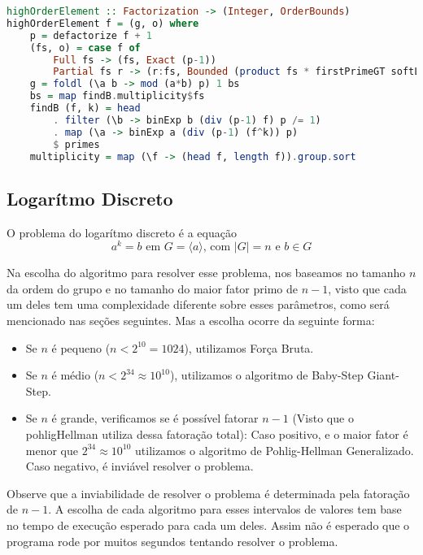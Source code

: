 \documentclass{article}
\begin{document}
\noindent\hspace{0.03\linewidth}
\begin{minipage}{.9\linewidth}
\begin{lstlisting}[language=haskell,caption=Algoritmo de Gauss]
highOrderElement :: Factorization -> (Integer, OrderBounds)
highOrderElement f = (g, o) where
    p = defactorize f + 1
    (fs, o) = case f of
        Full fs -> (fs, Exact (p-1))
        Partial fs r -> (r:fs, Bounded (product fs * firstPrimeGT softLimit) (p-1))
    g = foldl (\a b -> mod (a*b) p) 1 bs
    bs = map findB.multiplicity$fs
    findB (f, k) = head
        . filter (\b -> binExp b (div (p-1) f) p /= 1)
        . map (\a -> binExp a (div (p-1) (f^k)) p)
        $ primes
    multiplicity = map (\f -> (head f, length f)).group.sort

\end{lstlisting}
\end{minipage}

\subsection{Logarítmo Discreto}
\label{discreteLog}
O problema do logarítmo discreto é a equação
$$ a^k = b \text{ em } G = \langle a \rangle\text{, com }|G| = n\text{ e }b \in G$$

Na escolha do algoritmo para resolver esse problema, nos baseamos no tamanho $n$ da ordem do grupo e no tamanho do maior fator primo de $n-1$, visto que cada um deles tem uma complexidade diferente sobre esses parâmetros, como será mencionado nas seções seguintes. Mas a escolha ocorre da seguinte forma:
\begin{itemize}
    \item Se $n$ é pequeno ($n < 2^{10} = 1024$), utilizamos Força Bruta.
    \item Se $n$ é médio ($n < 2^{34} \approx 10^{10}$), utilizamos o algoritmo de Baby-Step Giant-Step.
    \item Se $n$ é grande, verificamos se é possível fatorar $n-1$ (Visto que o pohligHellman utiliza dessa fatoração total): 
    \subitem Caso positivo, e o maior fator é menor que $2^{34} \approx 10^{10}$ utilizamos o algoritmo de Pohlig-Hellman Generalizado.
    \subitem Caso negativo, é inviável resolver o problema. 
\end{itemize}

Observe que a inviabilidade de resolver o problema é determinada pela fatoração de $n-1$. A escolha de cada algoritmo para esses intervalos de valores tem base no tempo de execução esperado para cada um deles. Assim não é esperado que o programa rode por muitos segundos tentando resolver o problema.
\end{document}

